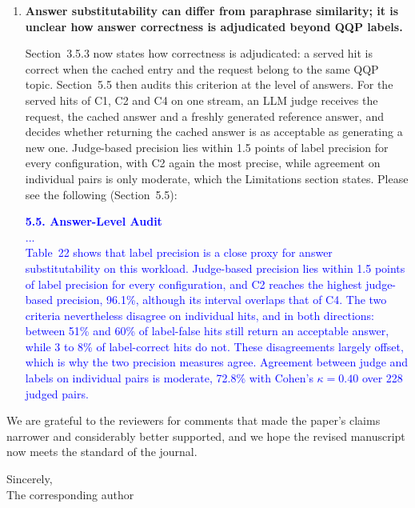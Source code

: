 \documentclass[11pt]{article}
\begin{document}
\begin{enumerate}[leftmargin=*, itemsep=1.2em]
\item \textbf{Answer substitutability can differ from paraphrase similarity; it is unclear how answer correctness is adjudicated beyond QQP labels.}

Section~3.5.3 now states how correctness is adjudicated: a served hit is correct when the cached entry and the request belong to the same QQP topic. Section~5.5 then audits this criterion at the level of answers. For the served hits of C1, C2 and C4 on one stream, an LLM judge receives the request, the cached answer and a freshly generated reference answer, and decides whether returning the cached answer is as acceptable as generating a new one. Judge-based precision lies within 1.5 points of label precision for every configuration, with C2 again the most precise, while agreement on individual pairs is only moderate, which the Limitations section states. Please see the following (Section~5.5):

\textcolor{blue}{\textbf{5.5. Answer-Level Audit}\\
...\\
Table~22 shows that label precision is a close proxy for answer substitutability on this workload. Judge-based precision lies within 1.5 points of label precision for every configuration, and C2 reaches the highest judge-based precision, 96.1\%, although its interval overlaps that of C4. The two criteria nevertheless disagree on individual hits, and in both directions: between 51\% and 60\% of label-false hits still return an acceptable answer, while 3 to 8\% of label-correct hits do not. These disagreements largely offset, which is why the two precision measures agree. Agreement between judge and labels on individual pairs is moderate, 72.8\% with Cohen's $\kappa=0.40$ over 228 judged pairs.}

\end{enumerate}

\bigskip
\noindent We are grateful to the reviewers for comments that made the paper's claims narrower and considerably better supported, and we hope the revised manuscript now meets the standard of the journal.

\bigskip
\noindent Sincerely, \\
{The corresponding author}
\end{document}

